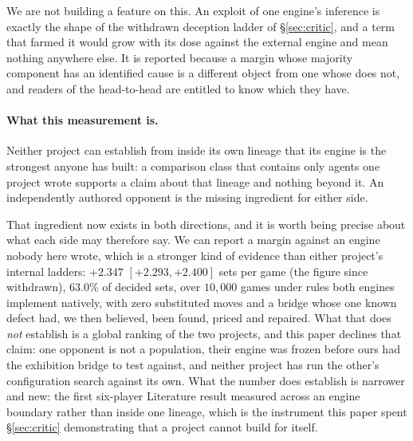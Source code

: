 \documentclass[11pt,letterpaper]{article}
\begin{document}
We are not building a feature on this. An exploit of one engine's
inference is exactly the shape of the withdrawn deception ladder of
\S\ref{sec:critic}, and a term that farmed it would grow with its dose against
the external engine and mean nothing anywhere else. It is reported because a margin whose
majority component has an identified cause is a different object from one whose
does not, and readers of the head-to-head are entitled to know which they have.

\paragraph{What this measurement is.} Neither project can establish from
inside its own lineage that its engine is the strongest anyone has built: a
comparison class that contains only agents one project wrote supports a
claim about that lineage and nothing beyond it. An independently authored
opponent is the missing ingredient for either side.

\begin{center}
\end{center}

\noindent That ingredient now exists in both directions, and it is worth being
precise about what each side may therefore say. We can report a margin
against an engine nobody here wrote, which is a stronger kind of evidence
than either project's internal ladders: $+2.347$ $[+2.293, +2.400]$ sets per
game (the figure since withdrawn), $63.0\%$ of decided sets, over $10{,}000$ games under rules both engines
implement natively, with zero substituted moves and a bridge whose one known
defect had, we then believed, been found, priced and repaired. What that does
\emph{not} establish
is a global ranking of the two projects, and this paper declines that claim:
one opponent is not a population, their
engine was frozen before ours had the exhibition bridge to test against,
and neither project has run the other's configuration search against its
own. What the number does establish is narrower and new: the first six-player
Literature result measured across an engine boundary rather than inside one
lineage, which is the instrument this paper spent \S\ref{sec:critic}
demonstrating that a project cannot build for itself.
\end{document}
